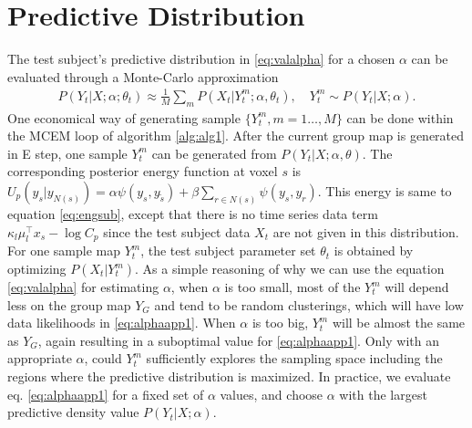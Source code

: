 \documentclass[review,authoryear]{elsarticle}
\begin{document}
\appendix
\section{Predictive Distribution}
\label{sec:appalpha}
The test subject's predictive distribution in \eqref{eq:valalpha} for a chosen
$\alpha$ can be evaluated through a Monte-Carlo approximation
\begin{align}
P(Y_t|X; \alpha; \theta_t) \approx \frac{1}{M}\sum_m P(X_t|Y_t^m; \alpha, \theta_t), \quad Y_t^m \sim P(Y_t|X; \alpha). \label{eq:alphaapp1}
\end{align}
One economical way of generating sample $\{Y_t^m, m = 1\dots, M\}$ can be done
within the MCEM loop of algorithm \ref{alg:alg1}. After the current group map is
generated in E step, one sample $Y_t^m$ can be generated from $P(Y_t|X; \alpha,
\theta)$. The corresponding posterior energy function at voxel $s$ is $U_p
(y_s|y_{ N(s)}) = \alpha \psi(y_s,y_{\tilde s}) + \beta\sum_{r\in N(s)} \psi
(y_s, y_r)$. This energy is same to equation \eqref{eq:engsub}, except that
there is no time series data term $\kappa_l \mu_l^{\intercal} x_s - \log C_p$
since the test subject data $X_t$ are not given in this distribution.  For one
sample map $Y_t^m$, the test subject parameter set $\theta_t$ is obtained by
optimizing $P(X_t | Y_t^m)$. As a simple reasoning of why we can use the equation
\eqref{eq:valalpha} for estimating $\alpha$, when $\alpha$ is too small, most of
the $Y_t^m$ will depend less on the group map $Y_G$ and tend to be random
clusterings, which will have low data likelihoods in \eqref{eq:alphaapp1}. When
$\alpha$ is too big, $Y_t^m$ will be almost the same as $Y_G$, again resulting
in a suboptimal value for \eqref{eq:alphaapp1}. Only with an appropriate
$\alpha$, could $Y_t^m$ sufficiently explores the sampling space including the
regions where the predictive distribution is maximized. In practice, we evaluate
eq. \eqref{eq:alphaapp1} for a fixed set of $\alpha$ values, and choose $\alpha$
with the largest predictive density value $P(Y_t|X; \alpha)$.



\end{document}
